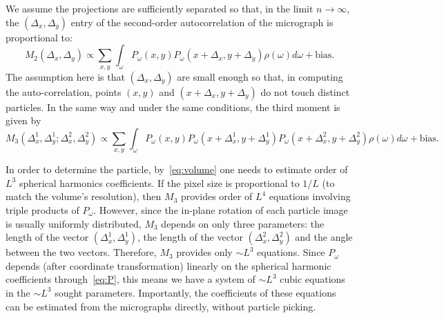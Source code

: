\documentclass[english,11pt]{article}
\newcommand{\1}{\mathbf{1}}
\theoremstyle{plain}
\theoremstyle{definition}
\theoremstyle{remark}
\theoremstyle{plain}
\theoremstyle{remark}
\theoremstyle{plain}
\theoremstyle{plain}
\begin{document}
We assume the projections are sufficiently separated so that, in the limit $n\to\infty$, the $(\Delta_x,\Delta_y)$ entry of the second-order autocorrelation of the micrograph is proportional to:
\begin{equation}
M_2(\Delta_x,\Delta_y)\propto\sum_{x,y}\int_{\omega} P_\omega(x,y)P_\omega(x+\Delta_x,y+\Delta_y)\rho(\omega)d\omega  + \textrm{bias}.
\end{equation}
 The assumption here is that $(\Delta_x, \Delta_y)$ are small enough so that, in computing the auto-correlation, points $(x, y)$ and $(x+\Delta_x, y+\Delta_y)$ do not touch distinct particles. 
In the same way and under the same conditions, the third moment is given by 
\begin{equation} 
M_3(\Delta_x^1,\Delta_y^1;\Delta_x^2,\Delta_y^2) \propto \sum_{x,y}\int_{\omega} P_\omega(x,y)P_\omega(x+\Delta_x^1,y+\Delta_y^1)P_\omega(x+\Delta_x^2,y+\Delta_y^2)\rho(\omega)d\omega + \textrm{bias}.
\end{equation}

In order to determine the particle, by~\eqref{eq:volume} one needs to estimate order of $L^3$ spherical harmonics coefficients. If the pixel size is proportional to $1/L$ (to match the volume's resolution), then $M_3$ provides order of $L^4$ equations involving triple products of $P_\omega$. 
However, 
since  the in-plane rotation of each particle image is usually uniformly distributed, $M_3$  depends on only three parameters: the length of the vector $(\Delta_x^1,\Delta_y^1)$, the length of the vector  $(\Delta_x^2,\Delta_y^2)$ and the  angle between the two vectors.  Therefore,  $M_3$  provides only $\sim L^3$ equations. 
 Since $P_\omega$ depends (after coordinate transformation) linearly on the spherical harmonic coefficients through~\eqref{eq:P}, this means we have a system of $\sim L^3$ cubic equations in the $\sim L^3$ sought parameters. Importantly, the coefficients of these equations can be estimated from the micrographs directly, without particle picking.
\end{document}
